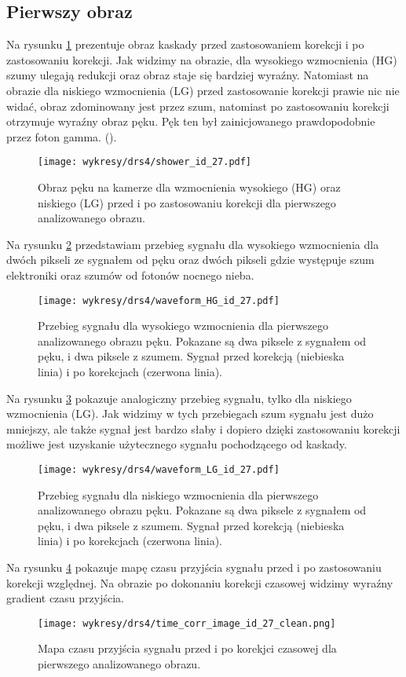 \documentclass[a4paper,11pt,twoside]{article}
\begin{document}
\subsection{Pierwszy obraz}
Na rysunku \ref{fig:image_27_map} prezentuje obraz kaskady przed zastosowaniem korekcji i po zastosowaniu korekcji. Jak widzimy na obrazie, dla wysokiego wzmocnienia (HG) szumy ulegają redukcji oraz obraz staje się bardziej wyraźny. Natomiast na obrazie dla niskiego wzmocnienia (LG) przed zastosowanie korekcji prawie nic nie widać, obraz zdominowany jest przez szum, natomiast po zastosowaniu korekcji otrzymuje wyraźny obraz pęku. Pęk ten był zainicjowanego prawdopodobnie przez foton gamma. ({\color{red}{tutaj nie jestem pewien czy to jest od fotonu}}). 
\begin{figure}[H] 
\centering
\texttt{[image: wykresy/drs4/shower\_id\_27.pdf]}
\caption{Obraz pęku na kamerze dla wzmocnienia wysokiego (HG) oraz niskiego (LG) przed i po zastosowaniu korekcji dla pierwszego analizowanego obrazu.}
\label{fig:image_27_map}
\end{figure}
Na rysunku \ref{fig:waveform_27_hg} przedstawiam przebieg sygnału dla wysokiego wzmocnienia dla dwóch pikseli ze sygnałem od pęku oraz dwóch pikseli gdzie występuje szum elektroniki oraz szumów od fotonów nocnego nieba. 
\begin{figure}[H] 
\centering
\texttt{[image: wykresy/drs4/waveform\_HG\_id\_27.pdf]}
\caption{Przebieg sygnału dla wysokiego wzmocnienia dla pierwszego analizowanego obrazu pęku. Pokazane są dwa piksele z sygnałem od pęku, i dwa piksele z szumem. Sygnał przed korekcją (niebieska linia) i po korekcjach (czerwona linia).}
\label{fig:waveform_27_hg}
\end{figure}
Na rysunku \ref{fig:waveform_27_lg} pokazuje analogiczny przebieg sygnału, tylko dla niskiego wzmocnienia (LG). Jak widzimy w tych przebiegach szum sygnału jest dużo mniejszy, ale także sygnał jest bardzo słaby i dopiero dzięki zastosowaniu korekcji możliwe jest uzyskanie użytecznego sygnału pochodzącego od kaskady.
\begin{figure}[H] 
\centering
\texttt{[image: wykresy/drs4/waveform\_LG\_id\_27.pdf]}
\caption{Przebieg sygnału dla niskiego wzmocnienia dla pierwszego analizowanego obrazu pęku. Pokazane są dwa piksele z sygnałem od pęku, i dwa piksele z szumem. Sygnał przed korekcją (niebieska linia) i po korekcjach (czerwona linia).}
\label{fig:waveform_27_lg}
\end{figure}
Na rysunku \ref{fig:map_time_27} pokazuje mapę czasu przyjścia sygnału przed i po zastosowaniu korekcji względnej. Na obrazie po dokonaniu korekcji czasowej widzimy wyraźny gradient czasu przyjścia.
\begin{figure}[H] 
\centering
\texttt{[image: wykresy/drs4/time\_corr\_image\_id\_27\_clean.png]}
\caption{Mapa czasu przyjścia sygnału przed i po korekjci czasowej dla pierwszego analizowanego obrazu.}
\label{fig:map_time_27}
\end{figure}
\newpage
\end{document}
